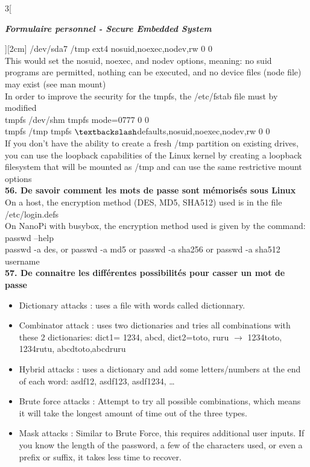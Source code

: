 \begin{multicols}{3}[\centerline{ \large\em \textbf{Formulaire personnel - Secure Embedded System}}][2cm]
/dev/sda7 /tmp ext4 nosuid,noexec,nodev,rw 0 0\\
This would set the nosuid, noexec, and nodev options, meaning: no suid programs are permitted, nothing can be executed, and no device files (node file) may exist (see man mount)\\
In order to improve the security for the tmpfs, the /etc/fstab file must by modified\\
tmpfs /dev/shm tmpfs mode=0777 0 0\\
tmpfs /tmp tmpfs $\textbackslash $defaults,nosuid,noexec,nodev,rw 0 0\\
If you don’t have the ability to create a fresh /tmp partition on existing
drives, you can use the loopback capabilities of the Linux kernel by creating a loopback filesystem that will be mounted as /tmp and can use the same
restrictive mount options
\\ \textbf{56. De savoir comment les mots de passe sont mémorisés sous Linux\\}
On a host, the encryption method (DES, MD5, SHA512) used is in the file
/etc/login.defs\\
 On NanoPi with busybox, the encryption method used is given by the command:\\
passwd –help\\
passwd -a des, or passwd -a md5 or passwd -a sha256 or passwd -a sha512
username
\\ \textbf{57. De connaitre les différentes possibilités pour casser un mot de passe}
\begin{itemize}
\item Dictionary attacks : uses a file with words called dictionnary. 
\item Combinator attack :  uses two dictionaries and tries all combinations with these 2 dictionaries: dict1= {1234, abcd}, dict2={toto, ruru} $\rightarrow$ 1234toto, 1234rutu, abcdtoto,abcdruru
\item Hybrid attacks :  uses a dictionary and add some letters/numbers at the end of each word: asdf12, asdf123, asdf1234, …
\item Brute force attacks : Attempt to try all possible combinations, which means it will take the longest amount of time out of the three types.
\item Mask attacks : Similar to Brute Force, this requires additional user inputs. If you know the length of the password, a few of the characters used, or even a prefix or suffix, it takes less time to recover.
\end{itemize}~

\end{multicols}
